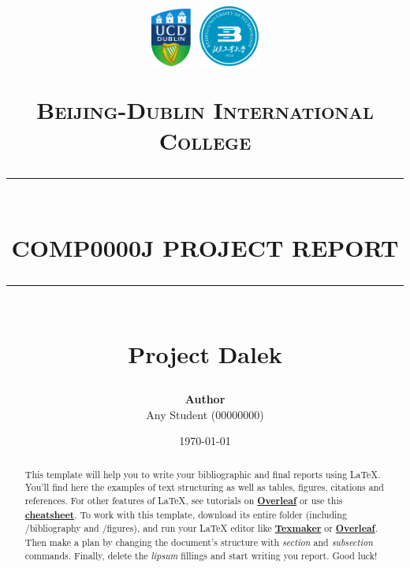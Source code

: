 \documentclass{article}
\newcommand{\HRule}[1]{\rule{\linewidth}{#1}}
\begin{document}





\title{ \normalsize  \includegraphics[width=0.1\textwidth]{images/UCD_Logo.pdf} \textbf{ }
\includegraphics[width=0.15\textwidth]{images/BJUT_Logo.pdf} \par \textsc{Beijing-Dublin International College}
		\\ [2.0cm]
		\HRule{1.5pt} \\ [0.35cm]
		\LARGE \textbf{\uppercase{COMP0000J Project Report}}
		\HRule{1.5pt} \\ [0.9cm] \textbf{\LARGE{Project Dalek}} \vspace*{10\baselineskip}
		}
\date{\today}
\author{\textbf{Author} \\ 
Any Student (00000000) \\
  }

\maketitle
\newpage

\tableofcontents
\newpage


\begin{abstract}
  This template will help you to write your bibliographic and final reports using \LaTeX{}. You'll find here the examples of text structuring as well as tables, figures, citations and references. For other features of \LaTeX, see tutorials on \href{https://www.overleaf.com/learn}{\textbf{Overleaf}} or use this \href{https://wch.github.io/latexsheet/}{\textbf{cheatsheet}}. To work with this template, download its entire folder (including /bibliography and /figures), and run your \LaTeX{}  editor like \href{http://www.xm1math.net/texmaker/}{\textbf{Texmaker}} or \href{https://www.overleaf.com}{\textbf{Overleaf}}. Then make a plan by changing the document's structure with \textit{section} and \textit{subsection} commands. Finally, delete the \textit{lipsum} fillings and start writing you report. Good luck!
  \end{abstract}
  
\end{document}
